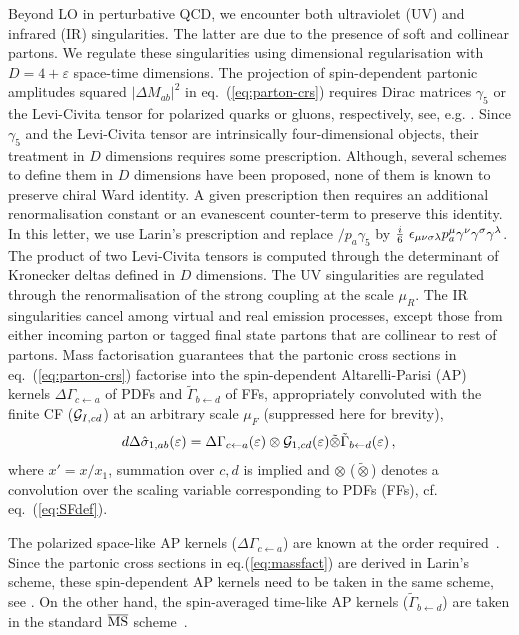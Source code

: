 \documentclass[%
 twocolumn,
 superscriptaddress,
 preprintnumbers,
 nofootinbib,
 amsmath,amssymb,
 aps,
 prl,
]{revtex4}
\begin{document}
{Beyond LO in perturbative QCD, we encounter both ultraviolet (UV) and 
infrared (IR) singularities.  The latter are due to the presence of soft and collinear partons.  
We regulate these singularities using dimensional regularisation with $D=4+\varepsilon$ 
space-time dimensions.
The projection of spin-dependent partonic amplitudes squared $|\Delta M_{ab}|^2$ in eq.~(\ref{eq:parton-crs}) requires Dirac matrices $\gamma_5$ or the Levi-Civita tensor for 
polarized quarks or gluons, respectively, see, e.g. \cite{Zijlstra:1993sh}. 
Since $\gamma_5$ and the Levi-Civita tensor are intrinsically four-dimensional objects, their treatment in $D$ dimensions requires some prescription. 
Although, several schemes to define them in $D$ dimensions have been proposed, 
none of them is known to preserve chiral Ward identity.  
A given prescription then requires an additional renormalisation constant or an evanescent counter-term to preserve this identity.  
In this letter, we use Larin's prescription \cite{Larin:1993tq}  and replace $\slash\!\!\!p_a\gamma_5$ by ${i\over 6} ~\epsilon_{\mu \nu \sigma \lambda} p_a^\mu \gamma^\nu \gamma^\sigma \gamma^\lambda$.  The product of two 
Levi-Civita tensors is computed through  the determinant of Kronecker deltas defined in $D$ dimensions.     
The UV singularities are regulated through the renormalisation of the strong coupling at the scale $\mu_R$.  
The IR singularities cancel among virtual and real emission processes, except those
from either incoming parton or tagged final state partons that are collinear to rest of partons.   
Mass factorisation guarantees that 
the partonic cross sections in eq.~(\ref{eq:parton-crs}) factorise into the spin-dependent Altarelli-Parisi (AP) kernels 
$\Delta \Gamma_{c\leftarrow a}$ of PDFs and $\tilde \Gamma_{b\leftarrow d}$ of FFs, 
appropriately convoluted with the finite CF (${\cal G}_{I,cd}$) 
at an arbitrary scale $\mu_F$ (suppressed here for brevity),  
%
\begin{eqnarray}
\label{eq:massfact}
{d\Delta \hat \sigma_{1,ab}(\varepsilon)}  = 
\Delta \Gamma_{c\leftarrow a}(\varepsilon) \otimes 
{\cal G}_{1,cd}(\varepsilon) \tilde \otimes 
\tilde \Gamma_{b\leftarrow d}(\varepsilon)
\, ,
\, 
\end{eqnarray}  
%
where $x'=x/x_1$, summation over $c,d$ is implied and $\otimes$ 
($\tilde \otimes$) denotes a convolution over the scaling variable corresponding to PDFs (FFs), cf. eq.~(\ref{eq:SFdef}).

The polarized space-like AP kernels ($\Delta \Gamma_{c\leftarrow a}$) are known at the order required~\cite{Mertig:1995ny,Vogelsang:1995vh,Vogelsang:1996im,Moch:2014sna,Blumlein:2021enk,Blumlein:2021ryt,Blumlein:2022gpp}.
Since the partonic cross sections in eq.(\ref{eq:massfact}) are derived in Larin's scheme, 
these spin-dependent AP kernels need to be taken in the same scheme, see \cite{Moch:2014sna}.
On the other hand, the spin-averaged time-like AP kernels ($\tilde \Gamma_{b\leftarrow d}$) are taken in the standard $\overline{\rm{MS}}$ scheme~\cite{Almasy:2011eq,Chen:2020uvt}.


}
\end{document}
